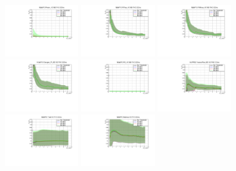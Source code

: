 \begin{center}

  \includegraphics[width=0.245\textwidth]{plots/Elost_profiles/Proton_KE_FHC_CCInc.pdf}
  \includegraphics[width=0.245\textwidth]{plots/Elost_profiles/PiPlus_KE_FHC_CCInc.pdf}
  \includegraphics[width=0.245\textwidth]{plots/Elost_profiles/PiMinus_KE_FHC_CCInc.pdf}
  \includegraphics[width=0.245\textwidth]{plots/Elost_profiles/Charged_Pi_KE_FHC_CCInc.pdf}
  \includegraphics[width=0.245\textwidth]{plots/Elost_profiles/Pi0_KE_FHC_CCInc.pdf}
  \includegraphics[width=0.245\textwidth]{plots/Elost_profiles/Proton+Pion_KE_FHC_CCInc.pdf}
  \includegraphics[width=0.245\textwidth]{plots/Elost_profiles/Total_FHC_CCInc.pdf}
  \includegraphics[width=0.245\textwidth]{plots/Elost_profiles/Hadrons_FHC_CCInc.pdf}
  
\end{center}

